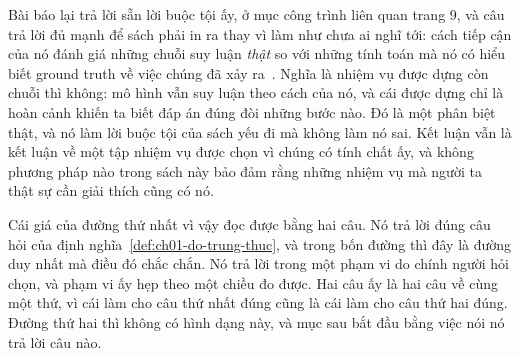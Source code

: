 %
Bài báo lại trả lời sẵn lời buộc tội ấy, ở mục công trình liên quan trang 9, và
câu trả lời đủ mạnh để sách phải in ra thay vì làm như chưa ai nghĩ tới: cách
tiếp cận của nó đánh giá những chuỗi suy luận \emph{thật} so với những tính toán
mà nó có hiểu biết ground truth về việc chúng đã xảy ra~\autocite{p21metrics}.
Nghĩa là nhiệm vụ được dựng còn chuỗi thì không: mô hình vẫn suy luận theo cách
của nó, và cái được dựng chỉ là hoàn cảnh khiến ta biết đáp án đúng đòi những
bước nào. Đó là một phân biệt thật, và nó làm lời buộc tội của sách yếu đi mà
không làm nó sai. Kết luận vẫn là kết luận về một tập nhiệm vụ được chọn vì
chúng có tính chất ấy, và không phương pháp nào trong sách này bảo đảm rằng
những nhiệm vụ mà người ta thật sự cần giải thích cũng có nó.

%
Cái giá của đường thứ nhất vì vậy đọc được bằng hai câu. Nó trả lời đúng câu hỏi
của định nghĩa~\ref{def:ch01-do-trung-thuc}, và trong bốn đường thì đây là đường
duy nhất mà điều đó chắc chắn. Nó trả lời trong một phạm vi do chính người hỏi
chọn, và phạm vi ấy hẹp theo một chiều đo được. Hai câu ấy là hai câu về cùng
một thứ, vì cái làm cho câu thứ nhất đúng cũng là cái làm cho câu thứ hai đúng.
Đường thứ hai thì không có hình dạng này, và mục sau bắt đầu bằng việc nói nó
trả lời câu nào.
